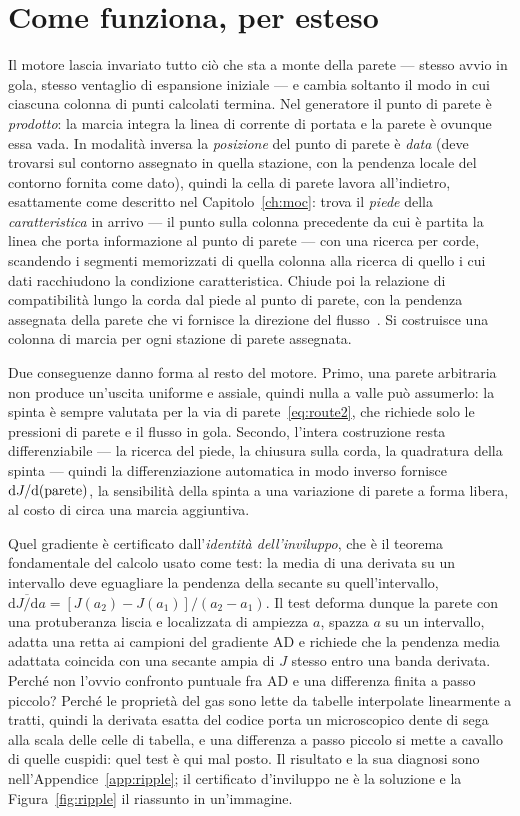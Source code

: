 \section{Come funziona, per esteso}

Il motore lascia invariato tutto ciò che sta a monte della parete
--- stesso avvio in gola, stesso ventaglio di espansione iniziale ---
e cambia soltanto il modo in cui ciascuna colonna di punti calcolati
termina. Nel generatore il punto di parete è \emph{prodotto}: la
marcia integra la linea di corrente di portata e la parete è
ovunque essa vada. In modalità inversa la \emph{posizione} del punto
di parete è \emph{data} (deve trovarsi sul contorno assegnato in
quella stazione, con la pendenza locale del contorno fornita come
dato), quindi la cella di parete lavora all'indietro, esattamente
come descritto nel Capitolo~\ref{ch:moc}: trova il \emph{piede}
della \emph{caratteristica} in arrivo --- il punto sulla colonna
precedente da cui è partita la linea che porta informazione al punto
di parete --- con una ricerca per corde, scandendo i segmenti
memorizzati di quella colonna alla ricerca di quello i cui dati
racchiudono la condizione caratteristica. Chiude poi la relazione di
compatibilità lungo la corda dal piede al punto di parete, con la
pendenza assegnata della parete che vi fornisce la direzione del
flusso~\cite{zucrow}. Si costruisce una colonna di marcia per ogni
stazione di parete assegnata.

Due conseguenze danno forma al resto del motore. Primo, una parete
arbitraria non produce un'uscita uniforme e assiale, quindi nulla a
valle può assumerlo: la spinta è sempre valutata per la via di
parete~\eqref{eq:route2}, che richiede solo le pressioni di parete e
il flusso in gola. Secondo, l'intera costruzione resta
differenziabile --- la ricerca del piede, la chiusura sulla corda,
la quadratura della spinta --- quindi la differenziazione automatica
in modo inverso fornisce $\mathrm{d}J/\mathrm{d}({\rm parete})$, la
sensibilità della spinta a una variazione di parete a forma libera,
al costo di circa una marcia aggiuntiva.

Quel gradiente è certificato dall'\emph{identità dell'inviluppo},
che è il teorema fondamentale del calcolo usato come test: la media
di una derivata su un intervallo deve eguagliare la pendenza della
secante su quell'intervallo,
$\overline{\mathrm{d}J/\mathrm{d}a} = [J(a_2)-J(a_1)]/(a_2-a_1)$. Il
test deforma dunque la parete con una protuberanza liscia e
localizzata di ampiezza $a$, spazza $a$ su un intervallo, adatta una
retta ai campioni del gradiente AD e richiede che la pendenza media
adattata coincida con una secante ampia di $J$ stesso entro una
banda derivata. Perché non l'ovvio confronto puntuale fra AD e una
differenza finita a passo piccolo? Perché le proprietà del gas sono
lette da tabelle interpolate linearmente a tratti, quindi la
derivata esatta del codice porta un microscopico dente di sega alla
scala delle celle di tabella, e una differenza a passo piccolo si
mette a cavallo di quelle cuspidi: quel test è qui mal posto. Il
risultato e la sua diagnosi sono nell'Appendice~\ref{app:ripple}; il
certificato d'inviluppo ne è la soluzione e la
Figura~\ref{fig:ripple} il riassunto in un'immagine.

